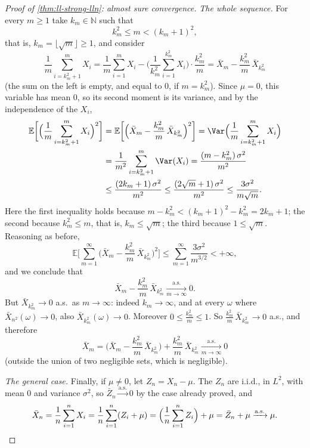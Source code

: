 \begin{proof}[Proof of \cref{thm:ll-strong-lln}: almost sure convergence]
\emph{The whole sequence.} For every $m\ge1$ take $k_m\in\mathbb N$ such that
\[
  k_m^2\le m<(k_m+1)^2,
\]
that is, $k_m=\lfloor\sqrt m\rfloor\ge1$, and consider
\[
  \frac1m\sum_{i=k_m^2+1}^mX_i=\frac1m\sum_{i=1}^mX_i-\Big(\frac1{k_m^2}\sum_{i=1}^{k_m^2}X_i\Big)\cdot\frac{k_m^2}m
  =\bar X_m-\frac{k_m^2}m\,\bar X_{k_m^2}
\]
(the sum on the left is empty, and equal to $0$, if $m=k_m^2$). Since $\mu=0$, this variable has
mean $0$, so its second moment is its variance, and by the independence of the $X_i$,
\[
\begin{aligned}
  \mathbb E\bigg[\Big(\frac1m\sum_{i=k_m^2+1}^mX_i\Big)^2\bigg]
  &=\mathbb E\bigg[\Big(\bar X_m-\frac{k_m^2}m\,\bar X_{k_m^2}\Big)^2\bigg]
  =\Var\Big(\frac1m\sum_{i=k_m^2+1}^mX_i\Big)\\
  &=\frac1{m^2}\sum_{i=k_m^2+1}^m\Var(X_i)
  =\frac{(m-k_m^2)\,\sigma^2}{m^2}\\
  &\le\frac{(2k_m+1)\,\sigma^2}{m^2}\le\frac{(2\sqrt m+1)\,\sigma^2}{m^2}\le\frac{3\sigma^2}{m\sqrt m} .
\end{aligned}
\]
Here the first inequality holds because $m-k_m^2<(k_m+1)^2-k_m^2=2k_m+1$; the second because
$k_m^2\le m$, that is, $k_m\le\sqrt m$; the third because $1\le\sqrt m$. Reasoning as before,
\[
  \mathbb E\bigg[\sum_{m=1}^\infty\Big(\bar X_m-\frac{k_m^2}m\,\bar X_{k_m^2}\Big)^2\bigg]
  \le\sum_{m=1}^\infty\frac{3\sigma^2}{m^{3/2}}<+\infty,
\]
and we conclude that
\[
  \bar X_m-\frac{k_m^2}m\,\bar X_{k_m^2}\xrightarrow[m\to\infty]{\text{a.s.}}0 .
\]
But $\bar X_{k_m^2}\to0$ a.s.\ as $m\to\infty$: indeed $k_m\to\infty$, and at every $\omega$ where
$\bar X_{n^2}(\omega)\to0$, also $\bar X_{k_m^2}(\omega)\to0$. Moreover $0\le\frac{k_m^2}m\le1$. So
$\frac{k_m^2}m\,\bar X_{k_m^2}\to0$ a.s., and therefore
\[
  \bar X_m=\Big(\bar X_m-\frac{k_m^2}m\,\bar X_{k_m^2}\Big)+\frac{k_m^2}m\,\bar X_{k_m^2}
  \xrightarrow[m\to\infty]{\text{a.s.}}0
\]
(outside the union of two negligible sets, which is negligible).

\emph{The general case.} Finally, if $\mu\ne0$, let $Z_n=X_n-\mu$. The $Z_n$ are i.i.d., in
$L^2$, with mean $0$ and variance $\sigma^2$, so $\bar Z_n\xrightarrow{\text{a.s.}}0$ by the case
already proved, and
\[
  \bar X_n=\frac1n\sum_{i=1}^nX_i=\frac1n\sum_{i=1}^n(Z_i+\mu)=\Big(\frac1n\sum_{i=1}^nZ_i\Big)+\mu
  =\bar Z_n+\mu\xrightarrow{\text{a.s.}}\mu .\qedhere
\]
\end{proof}


